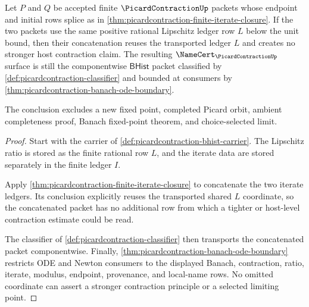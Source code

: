 \begin{theorem}
\label{thm:picardcontraction-ratio-ledger-nonexpansion}
Let $P$ and $Q$ be accepted finite $\PicardContractionUp$ packets whose endpoint and initial rows splice as in \autoref{thm:picardcontraction-finite-iterate-closure}. If the two packets use the same positive rational Lipschitz ledger row $L$ below the unit bound, then their concatenation reuses the transported ledger $L$ and creates no stronger host contraction claim. The resulting $\NameCert_{\PicardContractionUp}$ surface is still the componentwise $\mathsf{BHist}$ packet classified by \autoref{def:picardcontraction-classifier} and bounded at consumers by \autoref{thm:picardcontraction-banach-ode-boundary}.

The conclusion excludes a new fixed point, completed Picard orbit, ambient completeness proof, Banach fixed-point theorem, and choice-selected limit.
\end{theorem}
\begin{proof}
Start with the carrier of \autoref{def:picardcontraction-bhist-carrier}. The Lipschitz ratio is stored as the finite rational row $L$, and the iterate data are stored separately in the finite ledger $I$.

Apply \autoref{thm:picardcontraction-finite-iterate-closure} to concatenate the two iterate ledgers. Its conclusion explicitly reuses the transported shared $L$ coordinate, so the concatenated packet has no additional row from which a tighter or host-level contraction estimate could be read.

The classifier of \autoref{def:picardcontraction-classifier} then transports the concatenated packet componentwise. Finally, \autoref{thm:picardcontraction-banach-ode-boundary} restricts ODE and Newton consumers to the displayed Banach, contraction, ratio, iterate, modulus, endpoint, provenance, and local-name rows. No omitted coordinate can assert a stronger contraction principle or a selected limiting point.
\end{proof}

